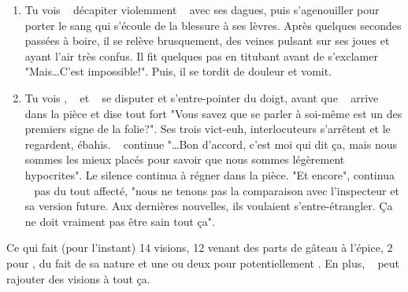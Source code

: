 {\begin{enumerate}
		\item Tu vois \nmPlayerX ~ décapiter violemment \nmPlayerVI ~ avec ses dagues, puis s'agenouiller pour porter le sang qui s'écoule de la blessure à ses lèvres. Après quelques secondes passées à boire, il se relève brusquement, des veines pulsant sur ses joues et ayant l'air très confus. Il fit quelques pas en titubant avant de s'exclamer "Mais\dots C'est impossible!". Puis, il se tordit de douleur et vomit.
		
		\item Tu vois \nmPlayerII, \nmPlayerI ~ et \nmPlayerIII ~ se disputer et s'entre-pointer du doigt, avant que \nmPlayerIV ~ arrive dans la pièce et dise tout fort "Vous savez que se parler à soi-même est un des premiers signe de la folie?". Ses trois vict-euh, interlocuteurs s'arrêtent et le regardent, ébahis. \nmPlayerIV ~ continue "\dots Bon d'accord, c'est moi qui dit ça, mais nous sommes les mieux placés pour savoir que nous sommes légèrement hypocrites". Le silence continua à régner dans la pièce. "Et encore", continua \nmPlayerIV ~ pas du tout affecté, "nous ne tenons pas la comparaison avec l'inspecteur et sa version future. Aux dernières nouvelles, ils voulaient s'entre-étrangler. Ça ne doit vraiment pas être sain tout ça".
	\end{enumerate}
	
	Ce qui fait (pour l'instant) 14 visions, 12 venant des parts de gâteau à l'épice, 2 pour \nmPlayerIX, du fait de sa nature et une ou deux pour potentiellement \nmPlayerVI. En plus, \nmPlayerIX ~ peut rajouter des visions à tout ça.
}








